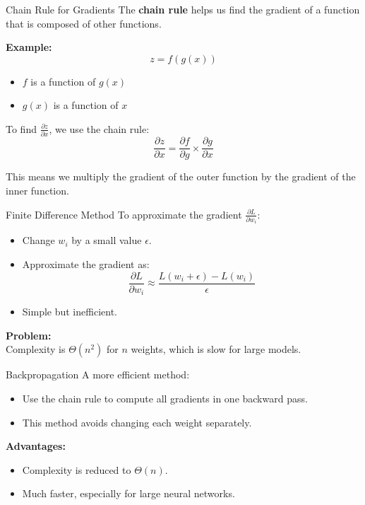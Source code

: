 \documentclass[serif, aspectratio=169]{beamer}
\begin{document}
\begin{frame}{Chain Rule for Gradients}
    The \textbf{chain rule} helps us find the gradient of a function that is composed of other functions.

    \vspace{10pt}
    \textbf{Example:}
    \[
    z = f(g(x))
    \]
    \begin{itemize}
        \item \( f \) is a function of \( g(x) \)
        \item \( g(x) \) is a function of \( x \)
    \end{itemize}
    
    \vspace{10pt}
    To find \( \frac{\partial z}{\partial x} \), we use the chain rule:
    \[
    \frac{\partial z}{\partial x} = \frac{\partial f}{\partial g} \times \frac{\partial g}{\partial x}
    \]
    
    \vspace{10pt}
    This means we multiply the gradient of the outer function by the gradient of the inner function.
\end{frame}


\begin{frame}{Finite Difference Method}
    To approximate the gradient \( \frac{\partial L}{\partial w_i} \):
    \begin{itemize}
        \item Change \( w_i \) by a small value \( \epsilon \).
        \item Approximate the gradient as:
        \[
        \frac{\partial L}{\partial w_i} \approx \frac{L(w_i + \epsilon) - L(w_i)}{\epsilon}
        \]
        \item Simple but inefficient.
    \end{itemize}
    
    \vspace{10pt}
    \textbf{Problem:} \\
    Complexity is \( \Theta(n^2) \) for \( n \) weights, which is slow for large models.
\end{frame}

\begin{frame}{Backpropagation}
    A more efficient method:
    \begin{itemize}
        \item Use the chain rule to compute all gradients in one backward pass.
        \item This method avoids changing each weight separately.
    \end{itemize}
    
    \vspace{10pt}
    \textbf{Advantages:}
    \begin{itemize}
        \item Complexity is reduced to \( \Theta(n) \).
        \item Much faster, especially for large neural networks.
    \end{itemize}
\end{frame}
\end{document}
